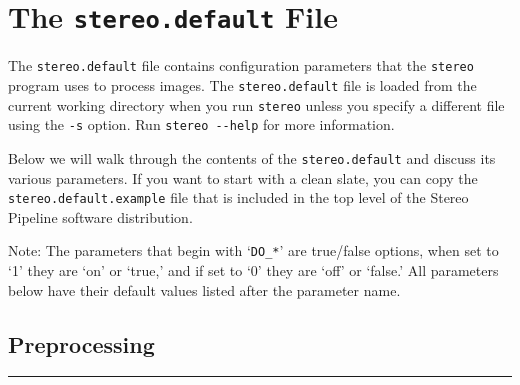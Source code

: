\chapter{The {\tt stereo.default} File}
\label{ch:stereodefault}

The \texttt{stereo.default} file contains configuration parameters
that the \texttt{stereo} program uses to process images.  The
\texttt{stereo.default} file is loaded from the current working
directory when you run \texttt{stereo} unless you specify a different
file using the \texttt{-s} option.  Run \texttt{stereo -\/-help} for
more information.

Below we will walk through the contents of the \texttt{stereo.default}
and discuss its various parameters.  If you want to start with a clean
slate, you can copy the \texttt{stereo.default.example} file that is
included in the top level of the Stereo Pipeline software distribution.

Note: The parameters that begin with `\texttt{DO\_*}' are true/false
options, when set to `1' they are `on' or `true,' and if set to `0'
they are `off' or `false.'  All parameters below have their default
values listed after the parameter name.


\section{Preprocessing}
\hrule
\bigskip

